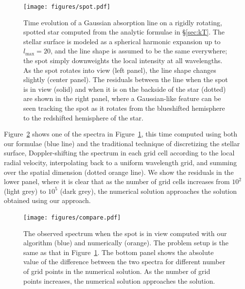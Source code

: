 \documentclass[modern]{aastex631}
\begin{document}
\begin{figure}[p!]
    \begin{centering}
        \texttt{[image: figures/spot.pdf]}
        \caption{%
            Time evolution of a Gaussian absorption line on a rigidly rotating, spotted star computed from the analytic formulae in \S\ref{sec:kT}.
            The stellar surface is modeled as a spherical harmonic expansion up to $l_\mathrm{max}=20$, and the line shape is assumed to be the same everywhere;
            the spot simply downweights the local intensity at all wavelengths.
            As the spot rotates into view (left panel), the line shape changes slightly (center panel). 
            The residuals between the line when the spot is in view (solid) and when it is on the backside of the star (dotted) are shown in the right panel, where a Gaussian-like feature can be seen tracking the spot as it rotates from the blueshifted hemisphere to the redshifted hemisphere of the star.
        }
        \label{fig:spot}
    \end{centering}
\end{figure}

Figure~\ref{fig:compare} shows one of the spectra in Figure~\ref{fig:spot}, this time computed using both our formulae (blue line) and the traditional technique of discretizing the stellar surface, Doppler-shifting the spectrum in each grid cell according to the local radial velocity, interpolating back to a uniform wavelength grid, and summing over the spatial dimension (dotted orange line). 
We show the residuals in the lower panel, where it is clear that as the number of grid cells increases from $10^2$ (light grey) to $10^5$ (dark grey), the numerical solution approaches the solution obtained using our approach.


\begin{figure}[t!]
    \begin{centering}
        \texttt{[image: figures/compare.pdf]}
        \caption{%
            The observed spectrum when the spot is in view computed with our algorithm (blue) and numerically (orange). 
            The problem setup is the same as that in Figure~\ref{fig:spot}. 
            The bottom panel shows the absolute value of the difference between the two spectra for different number of grid points in the numerical solution.
            As the number of grid points increases, the numerical solution approaches the \starry solution.
        }
        \label{fig:compare}
    \end{centering}
\end{figure}
\end{document}

